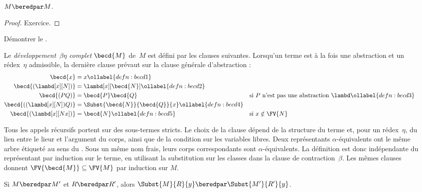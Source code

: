 \documentclass[../../../include/open-logic-section]{subfiles}
\begin{document}
\begin{thm}
$M \beredpar M$.
\end{thm}

\begin{proof}
Exercice.
\end{proof}

\begin{prob}
Démontrer le .
\end{prob}

\begin{defn}
Le \emph{développement~$\beta\eta$ complet}
$\becd{M}$ de~$M$ est défini par les clauses
suivantes. Lorsqu'un terme est à la fois
une abstraction et un rédex~$\eta$
admissible, la dernière clause prévaut
sur la clause générale d'abstraction :
\begin{align}
  \becd{x} &= x \ollabel{defn:becd1} \\
  \becd{(\lambd[x][N])}
    &= \lambd[x][\becd{N}] \ollabel{defn:becd2}\\
  \becd{(PQ)} &= \becd{P}\becd{Q}
    && \text{si $P$ n'est pas une abstraction $\lambd$}
    \ollabel{defn:becd3} \\
  \becd{((\lambd[x][N])Q)}
    &= \Subst{\becd{N}}{\becd{Q}}{x}
    \ollabel{defn:becd4} \\
  \becd{(\lambd[x][Nx])}
    &= \becd{N} \ollabel{defn:becd5}
    && \text{si $x\notin\FV{N}$}
\end{align}
\end{defn}

Tous les appels récursifs portent sur des sous-termes stricts.
Le choix de la clause dépend de la structure du terme et, pour
un rédex~$\eta$, du lien entre le lieur et l'argument du corps,
ainsi que de la condition sur les variables libres. Deux
représentants $\alpha$-équivalents ont le même arbre étiqueté
au sens du . Sous un même nom
frais, leurs corps correspondants sont $\alpha$-équivalents.
La définition est donc indépendante du représentant par
induction sur le terme, en utilisant la substitution sur
les classes dans la clause de contraction~$\beta$.
Les mêmes clauses donnent $\FV{\becd{M}}\subseteq\FV{M}$
par induction sur $M$.

\begin{lem}
Si $M \beredpar M'$ et $R \beredpar R'$,
alors $\Subst{M}{R}{y}\beredpar
\Subst{M'}{R'}{y}$.
\end{lem}
\end{document}
